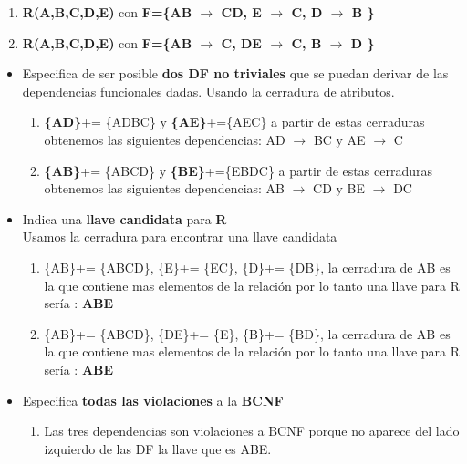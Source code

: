 \documentclass{article}
\begin{document}
\begin{enumerate}
    \begin{enumerate}
    	\item \textbf{R(A,B,C,D,E)} con \textbf{F=\{AB $\rightarrow$ CD, E $\rightarrow$ C, D $\rightarrow$ B \}}
    	\item \textbf{R(A,B,C,D,E)}  con \textbf{F=\{AB $\rightarrow$ C, DE $\rightarrow$ C, B $\rightarrow$ D \}}
    \end{enumerate}   

\begin{itemize}
	\item Especifica  de ser posible \textbf{dos DF no triviales} que se puedan derivar de las dependencias funcionales dadas.
	Usando la cerradura de atributos.
	\begin{enumerate}
		\item \textbf{\{AD\}}+= \{ADBC\} y \textbf{\{AE\}}+=\{AEC\} a partir de estas cerraduras obtenemos las siguientes dependencias: AD $\rightarrow$ BC y AE $\rightarrow$ C\\ 
		\item \textbf{\{AB\}}+= \{ABCD\} y \textbf{\{BE\}}+=\{EBDC\} a partir de estas cerraduras obtenemos las siguientes dependencias: AB $\rightarrow$ CD y BE $\rightarrow$ DC\\ 
		 
		
		
	\end{enumerate}
	\item Indica una \textbf{llave candidata} para \textbf{R} \\
	Usamos la cerradura para encontrar una llave candidata
	\begin{enumerate}
		\item \{AB\}+= \{ABCD\}, \{E\}+= \{EC\}, \{D\}+= \{DB\}, la cerradura de AB es la que contiene mas elementos de la relación por lo tanto una llave para R sería : \textbf{ABE}\\ 
		\item \{AB\}+= \{ABCD\}, \{DE\}+= \{E\}, \{B\}+= \{BD\}, la cerradura de AB es la que contiene mas elementos de la relación por lo tanto una llave para R sería : \textbf{ABE}\\ 
		
		
		
	\end{enumerate}
	
	\item Especifica \textbf{todas las violaciones}  a la \textbf{BCNF}\\
	\begin{enumerate}
		\item Las tres dependencias son violaciones a BCNF porque no aparece del lado izquierdo de las DF la llave que es ABE.\\
		

\end{enumerate}
\end{itemize}
\end{enumerate}
\end{document}
